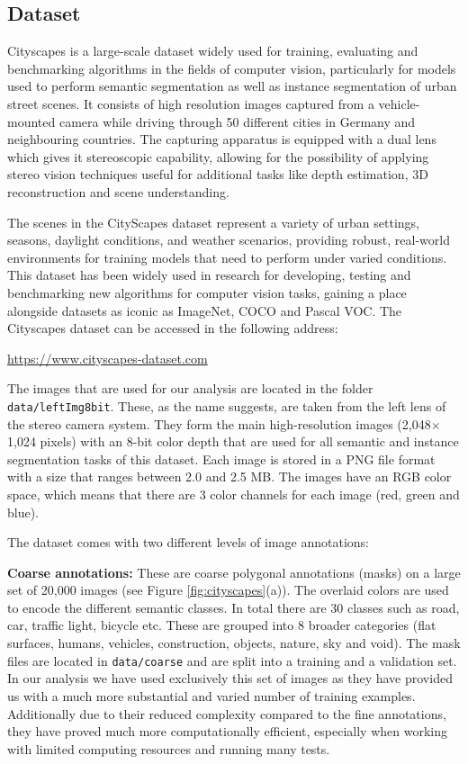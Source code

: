 \subsection{Dataset}

Cityscapes is a large-scale dataset widely used for training, evaluating and benchmarking algorithms in the fields of computer vision, particularly for models used to perform semantic segmentation as well as instance segmentation of urban street scenes. It consists of high resolution images captured from a vehicle-mounted camera while driving through 50 different cities in Germany and neighbouring countries. The capturing apparatus is equipped with a dual lens which gives it stereoscopic capability, allowing for the possibility of applying stereo vision techniques useful for additional tasks like depth estimation, 3D reconstruction and scene understanding. 

The scenes in the CityScapes dataset represent a variety of urban settings, seasons, daylight conditions, and weather scenarios, providing robust, real-world environments for training models that need to perform under varied conditions. This dataset has been widely used in research for developing, testing and benchmarking new algorithms for computer vision tasks, gaining a place alongside datasets as iconic as ImageNet, COCO and Pascal VOC. The Cityscapes dataset can be accessed in the following address:
\begin{center}
\url{https://www.cityscapes-dataset.com}
\end{center}

The images that are used for our analysis are located in the folder \texttt{data/leftImg8bit}. These, as the name suggests, are taken from the left lens of the stereo camera system. They form the main high-resolution images (2,048$\times$1,024 pixels) with an 8-bit color depth that are used for all semantic and instance segmentation tasks of this dataset. Each image is stored in a PNG file format with a size that ranges between 2.0 and 2.5 MB. The images have an RGB color space, which means that there are 3 color channels for each image (red, green and blue).

The dataset comes with two different levels of image annotations:

\textbf{Coarse annotations:} These are coarse polygonal annotations (masks) on a large set of 20,000 images (see Figure \ref{fig:cityscapes}(a)). The overlaid colors are used to encode the different semantic classes. In total there are 30 classes such as road, car, traffic light, bicycle etc. These are grouped into 8 broader categories (flat surfaces, humans, vehicles, construction, objects, nature, sky and void). The mask files are located in \texttt{data/coarse} and are split into a training and a validation set. In our analysis we have used exclusively this set of images as they have provided us with a much more substantial and varied number of training examples. Additionally due to their reduced complexity compared to the fine annotations, they have proved much more computationally efficient, especially when working with limited computing resources and running many tests.

